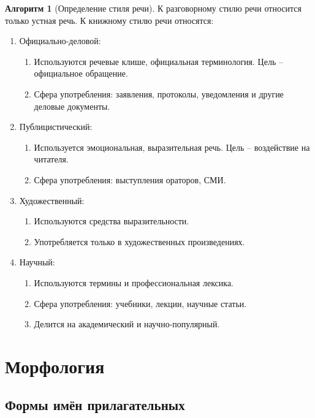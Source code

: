 \documentclass[12pt]{article}
\theoremstyle{definition}
\newtheorem{algorithm}[rrule]{Алгоритм}
\theoremstyle{remark}
\begin{document}
\begin{algorithm}[Определение стиля речи] К разговорному стилю речи относится только устная речь. К книжному стилю речи относятся:
    \begin{enumerate}
        \item Официально-деловой:
        \begin{enumerate}
            \item Используются речевые клише, официальная терминология. Цель -- официальное обращение.
            \item Сфера употребления: заявления, протоколы, уведомления и другие деловые документы.
        \end{enumerate}
        \item Публицистический:
        \begin{enumerate}
            \item Используется эмоциональная, выразительная речь. Цель -- воздействие на читателя.
            \item Сфера употребления: выступления ораторов, СМИ.
        \end{enumerate}
        \item Художественный:
        \begin{enumerate}
            \item Используются средства выразительности. 
            \item Употребляется только в художественных произведениях.
        \end{enumerate}
        \item Научный:
        \begin{enumerate}
            \item Используются термины и профессиональная лексика.
            \item Сфера употребления: учебники, лекции, научные статьи.
            \item Делится на академический и научно-популярный.
        \end{enumerate}
    \end{enumerate}
\end{algorithm}

\section{Морфология}

\subsection{Формы имён прилагательных}
\end{document}
